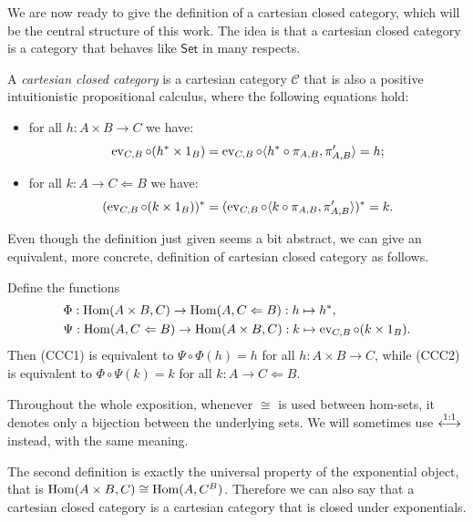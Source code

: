We are now ready to give the definition of a cartesian closed category, which will be the central structure of this work. The idea is that a cartesian closed category is a category that behaves like $\mathsf{Set}$ in many respects.

\begin{definition}
    A \emph{cartesian closed category} is a cartesian category $\mathcal C$ that is also a positive intuitionistic propositional calculus, where the following equations hold:
    \begin{itemize}
        \item[(\textnormal{CCC1})] for all $h : A \times B \to C$ we have:
        \[ \operatorname{ev}_{C,B} \circ (h^* \times 1_B) = \operatorname{ev}_{C,B} \circ \langle h^* \circ \pi_{A,B}, \pi_{A,B}'\rangle = h; \]
        \item[(\textnormal{CCC2})] for all $k : A \to C \Leftarrow B$ we have:
        \[ (\operatorname{ev}_{C,B} \circ (k \times 1_B))^* = (\operatorname{ev}_{C,B} \circ \langle k \circ \pi_{A,B}, \pi_{A,B}'\rangle)^* = k. \]
    \end{itemize}
\end{definition}

Even though the definition just given seems a bit abstract, we can give an equivalent, more concrete, definition of cartesian closed category as follows.

\begin{remark}\label{idx:currying}
    Define the functions
    \begin{align*}
        & \Phi : \operatorname{Hom}(A \times B, C) \to \operatorname{Hom}(A, C \Leftarrow B) : h \mapsto h^*, \\
        & \Psi : \operatorname{Hom}(A, C \Leftarrow B) \to \operatorname{Hom}(A \times B, C) : k \mapsto \operatorname{ev}_{C,B} \circ (k \times 1_B).
    \end{align*}
    Then (CCC1) is equivalent to $\Psi \circ \Phi(h) = h$ for all $h : A \times B \to C$, while (CCC2) is equivalent to $\Phi \circ \Psi(k) = k$ for all $k : A \to C \Leftarrow B$.
\end{remark}

\begin{remark}
    Throughout the whole exposition, whenever $\cong$ is used between hom-sets, it denotes only a bijection between the underlying sets. We will sometimes use $\overset{\textnormal{1:1}}{\longleftrightarrow}$ instead, with the same meaning.
\end{remark}

The second definition is exactly the universal property of the exponential object, that is $\operatorname{Hom}(A \times B, C) \cong \operatorname{Hom}(A, C^B)$. Therefore we can also say that a cartesian closed category is a cartesian category that is closed under exponentials.

